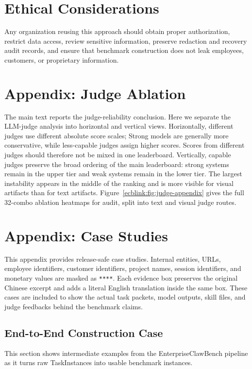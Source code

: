 \documentclass[11pt, a4paper, copyright, frontis]{frontis}
\newcommand{\ecbpipe}{EnterpriseClawBench pipeline}
\newcommand{\inlinett}[1]{{\footnotesize\texttt{#1}}}
\begin{document}
\section{Ethical Considerations}
Any organization reusing this approach should obtain proper authorization, restrict data access, review sensitive information, preserve redaction and recovery audit records, and ensure that benchmark construction does not leak employees, customers, or proprietary information.



\appendix

\section{Appendix: Judge Ablation}
\label{ecblink:sec:judge-ablation}
The main text reports the judge-reliability conclusion. Here we separate the LLM-judge analysis into horizontal and vertical views. Horizontally, different judges use different absolute score scales; Strong models are generally more conservative, while less-capable judges assign higher scores. Scores from different judges should therefore not be mixed in one leaderboard. Vertically, capable judges preserve the broad ordering of the main leaderboard: strong systems remain in the upper tier and weak systems remain in the lower tier. The largest instability appears in the middle of the ranking and is more visible for visual artifacts than for text artifacts. Figure~\ref{ecblink:fig:judge-appendix} gives the full 32-combo ablation heatmaps for audit, split into text and visual judge routes.

\section{Appendix: Case Studies}
This appendix provides release-safe case studies. Internal entities, URLs, employee identifiers, customer identifiers, project names, session identifiers, and monetary values are masked as \inlinett{****}. Each evidence box preserves the original Chinese excerpt and adds a literal English translation inside the same box. These cases are included to show the actual task packets, model outputs, skill files, and judge feedbacks behind the benchmark claims.

\subsection{End-to-End Construction Case}
This section shows intermediate examples from the \ecbpipe{} as it turns raw TaskInstances into usable benchmark instances.
\end{document}
